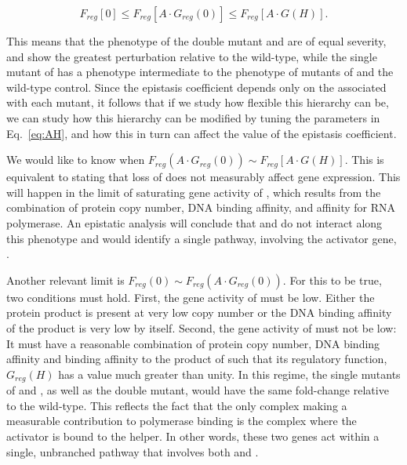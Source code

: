 \begin{equation}
F_{reg}[0] \leq F_{reg}[A \cdot G_{reg}(0)] \leq F_{reg}[A \cdot G(H)].
\end{equation}

This means that the phenotype of the double mutant  and
 are of equal severity, and show the greatest perturbation relative
to the wild-type, while the single mutant of  has a phenotype
intermediate to the phenotype of mutants of  and the wild-type control.
Since the epistasis coefficient depends only on the \Freg{} associated with
each mutant, it follows that if we study how flexible this hierarchy can be,
we can study how this hierarchy can be modified by tuning the parameters in
Eq.~\ref{eq:AH}, and how this in turn can affect the value of the epistasis
coefficient.

We would like to know when
\(F_{reg}(A\cdot G_{reg}(0)) \sim F_{reg}[A \cdot G(H)]\).  This is equivalent to
stating that loss of  does not measurably affect gene expression. This
will happen in the limit of saturating gene activity of , which results
from the combination of protein copy number, DNA binding affinity, and affinity
for RNA polymerase.
An epistatic analysis will conclude that  and 
do not interact along this phenotype and would identify a single pathway,
involving the activator gene, .

Another relevant limit is \(F_{reg}(0) \sim F_{reg}(A\cdot G_{reg}(0))\). For this
to be true, two conditions must hold. First, the gene activity of  must
be low. Either the protein product is present at very low copy number or the
DNA binding affinity of the product is very low by itself. Second, the gene
activity of  must not be low: It must have a reasonable combination of
protein copy number, DNA binding affinity and binding affinity to the product of
 such that its regulatory function, \(G_{reg}(H)\) has a value much
greater than unity. In this regime, the single mutants of  and ,
as well as the double mutant, would have the same fold-change relative to the
wild-type.
This reflects the fact that the only
complex making a measurable contribution to polymerase binding is the complex
where the activator is bound to the helper. In other words, these two genes act
within a single, unbranched pathway that involves both  and .

